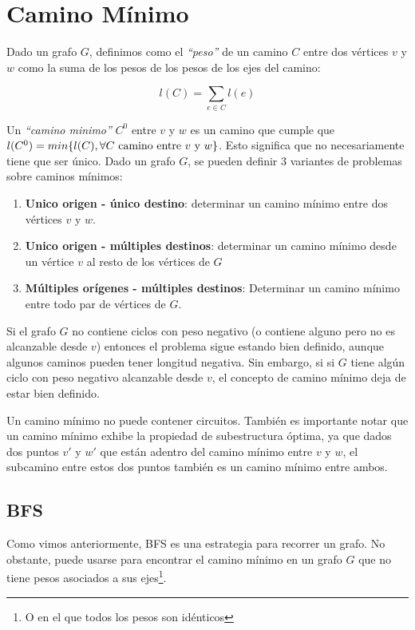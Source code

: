 \newpage
\section{Camino M\'inimo}

Dado un grafo $G$, definimos como el \emph{``peso''} de un camino $C$ entre dos v\'ertices $v$ y $w$ como la suma de los pesos de los pesos de los ejes del camino:

\begin{equation}
l(C) = \sum_{e \in C} l(e)
\end{equation}

Un \emph{``camino minimo''} $C^0$ entre $v$ y $w$ es un camino que cumple que $l(C^0) = min \{ l(C), \forall \textrm{$ C$ camino entre $v$ y $w$}  \}$. Esto significa que no necesariamente tiene que ser \'unico. Dado un grafo $G$, se pueden definir 3 variantes de problemas sobre caminos m\'inimos:

\begin{enumerate}
\item \textbf{Unico origen - \'unico destino}: determinar un camino m\'inimo entre dos v\'ertices $v$ y $w$.
\item \textbf{Unico origen - m\'ultiples destinos}: determinar un camino m\'inimo desde un v\'ertice $v$ al resto de los v\'ertices de $G$
\item \textbf{M\'ultiples or\'igenes - m\'ultiples destinos}: Determinar un camino m\'inimo entre todo par de v\'ertices de $G$.
\end{enumerate}

Si el grafo $G$ no contiene ciclos con peso negativo (o contiene alguno pero no es alcanzable desde $v$) entonces el problema sigue estando bien definido, aunque algunos caminos pueden tener longitud negativa. Sin embargo, si si $G$ tiene alg\'un ciclo con peso negativo alcanzable desde $v$, el concepto de camino m\'inimo deja de estar bien definido.

Un camino m\'inimo no puede contener circuitos. Tambi\'en es importante notar que un camino m\'inimo exhibe la propiedad de subestructura \'optima, ya que dados dos puntos $v'$ y $w'$ que est\'an adentro del camino m\'inimo entre $v$ y $w$, el subcamino entre estos dos puntos tambi\'en es un camino m\'inimo entre ambos.

\subsection{BFS}

Como vimos anteriormente, BFS es una estrategia para recorrer un grafo. No obstante, puede usarse para encontrar el camino m\'inimo en un grafo $G$ que no tiene pesos asociados a sus ejes\footnote{O en el que todos los pesos son id\'enticos}.

